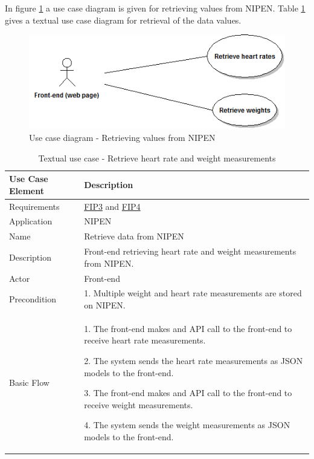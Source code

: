 In figure \ref{figure:use-case-diagram-nipen-front-end} a use case diagram is given for retrieving values from NIPEN.
Table \ref{table:use-case-retrieve-heart-rate-weight} gives a textual use case diagram for retrieval of the data values.

\begin{figure}[H]
\centering
\includegraphics[scale=0.6]{../Figures/use-case-diagram-nipen-front-end.png}
\caption{Use case diagram - Retrieving values from NIPEN}
\label{figure:use-case-diagram-nipen-front-end}
\end{figure}

\begin{table}[H]
\begin{center}
\begin{tabular}{ l | p{10cm} }
  \hline
  \textbf{Use Case Element} & \textbf{Description} \\ \hline\hline
  Requirements & \hyperref[table:reqip]{FIP3} and \hyperref[table:reqip]{FIP4}\\ \hline
  Application & NIPEN \\ \hline
  Name & Retrieve data from NIPEN \\ \hline
  Description & Front-end retrieving heart rate and weight measurements from NIPEN. \\ \hline
  Actor & Front-end \\ \hline
  Precondition &
	\par 1. Multiple weight and heart rate measurements are stored on NIPEN.
	\\ \hline
  Basic Flow & 
  	\par 1. The front-end makes and API call to the front-end to receive heart rate measurements.
  	\par 2. The system sends the heart rate measurements as JSON models to the front-end. 
  	\par 3. The front-end makes and API call to the front-end to receive weight measurements.
  	\par 4. The system sends the weight measurements as JSON models to the front-end.
  	\\ \hline
\end{tabular}
\end{center}
\caption{Textual use case - Retrieve heart rate and weight measurements}
\label{table:use-case-retrieve-heart-rate-weight}
\end{table}

